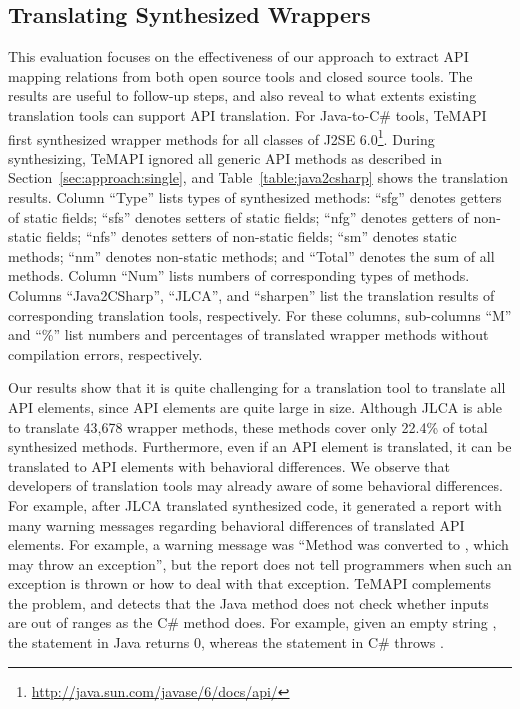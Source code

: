 \subsection{Translating Synthesized Wrappers}
\label{sec:evaluation:element}
This evaluation focuses on the effectiveness of our approach to extract API mapping relations from both open source tools and closed source tools. The results are useful to follow-up steps, and also reveal to what extents existing translation tools can support API translation. For Java-to-C\# tools, TeMAPI first synthesized wrapper methods for all classes of J2SE 6.0\footnote{\url{http://java.sun.com/javase/6/docs/api/}}. During synthesizing,  TeMAPI ignored all generic API methods as described in Section~\ref{sec:approach:single}, and Table~\ref{table:java2csharp} shows the translation results. Column ``Type'' lists types of synthesized methods: ``sfg'' denotes getters of static fields; ``sfs'' denotes setters of static fields; ``nfg'' denotes getters of non-static fields; ``nfs'' denotes setters of non-static fields; ``sm'' denotes static methods; ``nm'' denotes non-static methods; and ``Total'' denotes the sum of all methods. Column ``Num'' lists numbers of corresponding types of methods. Columns ``Java2CSharp'', ``JLCA'', and ``sharpen'' list the translation results of corresponding translation tools, respectively. For these columns, sub-columns ``M'' and ``\%'' list numbers and percentages of translated wrapper methods without compilation errors, respectively.


Our results show that it is quite challenging for a translation tool to translate all API elements, since API elements are quite large in size. Although JLCA is able to translate 43,678 wrapper methods, these methods cover only 22.4\% of total synthesized methods. Furthermore, even if an API element is translated, it can be translated to API elements with behavioral differences. We observe that developers of translation tools may already aware of some behavioral differences. For example, after JLCA translated synthesized code, it generated a report with many warning messages regarding behavioral differences of translated API elements. For example, a warning message was ``Method  was converted to , which may throw an exception'', but the report does not tell programmers when such an exception is thrown or how to deal with that exception. TeMAPI complements the problem, and detects that the Java method does not check whether inputs are out of ranges as the C\# method does. For example, given an empty string , the  statement in Java returns 0, whereas the  statement in C\# throws .


